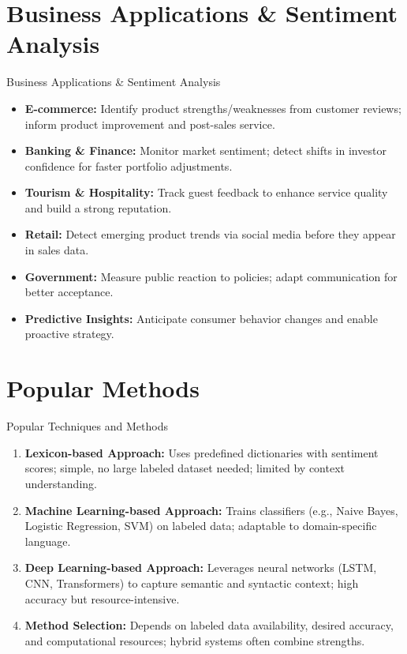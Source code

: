 \documentclass[aspectratio=169, table]{beamer}
\begin{document}
\section{Business Applications \& Sentiment Analysis}
\begin{frame}{Business Applications \& Sentiment Analysis}
	\vspace{20pt}
	\begin{itemize}
		\item \textbf{E-commerce:} Identify product strengths/weaknesses from customer reviews; inform product improvement and post-sales service.
		\item \textbf{Banking \& Finance:} Monitor market sentiment; detect shifts in investor confidence for faster portfolio adjustments.
		\item \textbf{Tourism \& Hospitality:} Track guest feedback to enhance service quality and build a strong reputation.
		\item \textbf{Retail:} Detect emerging product trends via social media before they appear in sales data.
		\item \textbf{Government:} Measure public reaction to policies; adapt communication for better acceptance.
		\item \textbf{Predictive Insights:} Anticipate consumer behavior changes and enable proactive strategy.
	\end{itemize}
\end{frame}

\section{Popular Methods}

\begin{frame}{Popular Techniques and Methods}
	\vspace{20pt}
	\begin{enumerate}
		\item \textbf{Lexicon-based Approach:} Uses predefined dictionaries with sentiment scores; simple, no large labeled dataset needed; limited by context understanding.
		\item \textbf{Machine Learning-based Approach:} Trains classifiers (e.g., Naive Bayes, Logistic Regression, SVM) on labeled data; adaptable to domain-specific language.
		\item \textbf{Deep Learning-based Approach:} Leverages neural networks (LSTM, CNN, Transformers) to capture semantic and syntactic context; high accuracy but resource-intensive.
		\item \textbf{Method Selection:} Depends on labeled data availability, desired accuracy, and computational resources; hybrid systems often combine strengths.
	\end{enumerate}
\end{frame}
\end{document}
